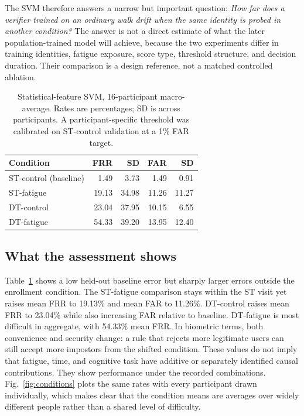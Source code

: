\documentclass[conference]{IEEEtran}
\begin{document}
The SVM therefore answers a narrow but important question: \emph{How far does a verifier trained on an ordinary walk drift when the same identity is probed in another condition?} The answer is not a direct estimate of what the later population-trained model will achieve, because the two experiments differ in training identities, fatigue exposure, score type, threshold structure, and decision duration. Their comparison is a design reference, not a matched controlled ablation.

\begin{table}[t]
\caption{Statistical-feature SVM, 16-participant macro-average. Rates are percentages; SD is across participants. A participant-specific threshold was calibrated on ST-control validation at a 1\% FAR target.}
\label{tab:svm}
\centering\small
\begin{tabular}{lrrrr}
\toprule
Condition & FRR & SD & FAR & SD\\
\midrule
ST-control (baseline) & 1.49 & 3.73 & 1.49 & 0.91\\
ST-fatigue & 19.13 & 34.98 & 11.26 & 11.27\\
DT-control & 23.04 & 37.95 & 10.15 & 6.55\\
DT-fatigue & 54.33 & 39.20 & 13.95 & 12.40\\
\bottomrule
\end{tabular}
\end{table}

\subsection{What the assessment shows}
Table~\ref{tab:svm} shows a low held-out baseline error but sharply larger errors outside the enrollment condition. The ST-fatigue comparison stays within the ST visit yet raises mean FRR to 19.13\% and mean FAR to 11.26\%. DT-control raises mean FRR to 23.04\% while also increasing FAR relative to baseline. DT-fatigue is most difficult in aggregate, with 54.33\% mean FRR. In biometric terms, both convenience and security change: a rule that rejects more legitimate users can still accept more impostors from the shifted condition. These values do not imply that fatigue, time, and cognitive task have additive or separately identified causal contributions. They show performance under the recorded combinations. Fig.~\ref{fig:conditions} plots the same rates with every participant drawn individually, which makes clear that the condition means are averages over widely different people rather than a shared level of difficulty.
\end{document}

